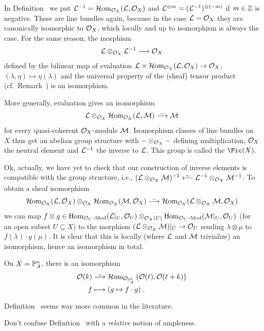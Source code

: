 \documentclass[a4paper,parskip=half,numbers=enddot, DIV=12]{scrreprt}
\begin{document}
\begin{rem}
	\begin{alphanumerate}
		\item {}In Definition~ we put $\mathcal{L}^{-1}=\operatorname{\mathcal{H} om}_{\mathcal{O}_X}(\mathcal{L},\mathcal{O}_X)$ and $\mathcal{L}^{\otimes m}=(\mathcal{L}^{-1})^{\otimes (-m)}$ if $m\in\mathbb{Z}$ is negative. These are line bundles again, because in the case $\mathcal{L}=\mathcal{O}_X$ they are canonically isomorphic to $\mathcal{O}_X$, which locally and up to isomorphism is always the case. For the same reason, the morphism
		\begin{align*}
			\Ll\otimes_{\Oo_X}\Ll^{-1}\morphism\Oo_X
		\end{align*}
		defined by the bilinear map of evaluation $\Ll\times\Hhom_{\Oo_X}(\Ll,\Oo_X)\morphism\Oo_X$, $(\lambda,\eta)\mapsto\eta(\lambda)$ and the universal property of the (sheaf) tensor product (cf.\ Remark~) is an isomorphism. 
		
		More generally, evaluation gives an isomorphism 
		\begin{align*}
			\Ll\otimes_{\Oo_X}\Hhom_{\Oo_X}(\Ll,\Mm)\isomorphism\Mm
		\end{align*}
		for every quasi-coherent $\mathcal{O}_X$-module $\mathcal{M}$. Isomorphism classes of line bundles on $X$ thus get an abelian group structure with $-\otimes_{\mathcal{O}_X}-$ defining multiplication, $\mathcal{O}_X$ the neutral element and $\mathcal{L}^{-1}$ the inverse to $\mathcal{L}$. This group is called the  $\Pic(X)$.
		
		Ok, actually, we have yet to check that our construction of inverse elements is compatible with the group structure, i.e., $(\Ll\otimes_{\Oo_X}\Mm)^{-1}\lisomorphism \Ll^{-1}\otimes_{\Oo_X}\Mm^{-1}$. To obtain a sheaf isomorphism 
		\begin{align*}
			\Hhom_{\Oo_X}(\Ll,\Oo_X)\otimes_{\Oo_X}\Hhom_{\Oo_X}(\Mm,\Oo_X)\isomorphism\Hhom_{\Oo_X}(\Ll\otimes_{\Oo_X}\Mm,\Oo_X)
		\end{align*}
		we can map $f\otimes g\in\operatorname{Hom}_{\mathcal{O}_U\operatorname{-Mod}}(\mathcal{L}|_U,\mathcal{O}_U)\otimes_{\mathcal{O}_X(U)}\operatorname{Hom}_{\mathcal{O}_U\operatorname{-Mod}}(\mathcal{M}|_U,\mathcal{O}_U)$ (for an open subset $U\subseteq X$) to the morphism $(\Ll\otimes_{\Oo_X}\Mm)|_U\morphism\Oo_U$ sending $\lambda\otimes\mu$ to $f(\lambda)\cdot g(\mu)$. It is clear that this is locally (where $\mathcal{L}$ and $\mathcal{M}$ trivialize) an isomorphism, hence an isomorphism in total.
		\item On $X=\mathbb{P}_A^n$, there is an isomorphism
		\begin{align*}
			\Oo(k)&\isomorphism\Hhom_{\Oo_{\IP_A^n}}\big(\Oo(\ell),\Oo(\ell+k)\big)\\
			f&\longmapsto (g\mapsto f\cdot g)\;.
		\end{align*}
		\item Definition~ seems way more common in the literature.
		\item Don't confuse Definition~ with a \emph{relative} notion of ampleness.
	\end{alphanumerate}
\end{rem}
\end{document}
